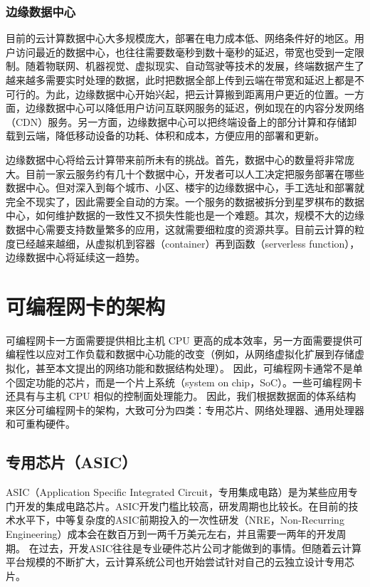 \subsubsection{边缘数据中心}

目前的云计算数据中心大多规模庞大，部署在电力成本低、网络条件好的地区。用户访问最近的数据中心，也往往需要数毫秒到数十毫秒的延迟，带宽也受到一定限制。随着物联网、机器视觉、虚拟现实、自动驾驶等技术的发展，终端数据产生了越来越多需要实时处理的数据，此时把数据全部上传到云端在带宽和延迟上都是不可行的。为此，边缘数据中心开始兴起，把云计算搬到距离用户更近的位置。一方面，边缘数据中心可以降低用户访问互联网服务的延迟，例如现在的内容分发网络（CDN）服务。另一方面，边缘数据中心可以把终端设备上的部分计算和存储卸载到云端，降低移动设备的功耗、体积和成本，方便应用的部署和更新。

边缘数据中心将给云计算带来前所未有的挑战。首先，数据中心的数量将非常庞大。目前一家云服务约有几十个数据中心，开发者可以人工决定把服务部署在哪些数据中心。但对深入到每个城市、小区、楼宇的边缘数据中心，手工选址和部署就完全不现实了，因此需要全自动的方案。一个服务的数据被拆分到星罗棋布的数据中心，如何维护数据的一致性又不损失性能也是一个难题。其次，规模不大的边缘数据中心需要支持数量繁多的应用，这就需要细粒度的资源共享。目前云计算的粒度已经越来越细，从虚拟机到容器（container）再到函数（serverless function），边缘数据中心将延续这一趋势。


\section{可编程网卡的架构}
\label{smartnic-architecture}

可编程网卡一方面需要提供相比主机 CPU 更高的成本效率，另一方面需要提供可编程性以应对工作负载和数据中心功能的改变（例如，从网络虚拟化扩展到存储虚拟化，甚至本文提出的网络功能和数据结构处理）。
因此，可编程网卡通常不是单个固定功能的芯片，而是一个片上系统（system on chip，SoC）。一些可编程网卡还具有与主机 CPU 相似的控制面处理能力。
因此，我们根据数据面的体系结构来区分可编程网卡的架构，大致可分为四类：专用芯片、网络处理器、通用处理器和可重构硬件。

\subsection{专用芯片（ASIC）}
\label{smartnic-asic}


ASIC（Application Specific Integrated Circuit，专用集成电路）是为某些应用专门开发的集成电路芯片。ASIC开发门槛比较高，研发周期也比较长。在目前的技术水平下，中等复杂度的ASIC前期投入的一次性研发（NRE，Non-Recurring Engineering）成本会在数百万到一两千万美元左右，并且需要一两年的开发周期。
在过去，开发ASIC往往是专业硬件芯片公司才能做到的事情。但随着云计算平台规模的不断扩大，云计算系统公司也开始尝试针对自己的云独立设计专用芯片。

